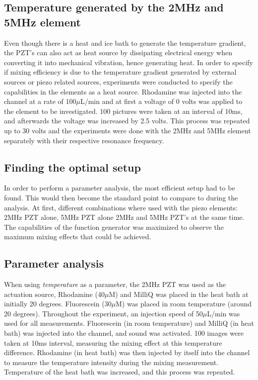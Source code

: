 \documentclass[twoside,twocolumn,9pt,a4paper]{IEEEtran}
\begin{document}
\subsection{Temperature generated by the 2MHz and 5MHz element}
\label{tempelements}

Even though there is a heat and ice bath to generate the temperature gradient, the PZT's can also act as heat source by dissipating electrical energy when converting it into mechanical vibration, hence generating heat. In order to specify if mixing efficiency is due to the temperature gradient generated by external sources or piezo related sources, experiments were conducted to specify the capabilities in the elements as a heat source. Rhodamine was injected into the channel at a rate of 100$\mu$L/min and at first a voltage of 0 volts was applied to the element to be investigated. 100 pictures were taken at an interval of 10ms, and afterwards the voltage was increased by 2.5 volts. This process was repeated up to 30 volts and the experiments were done with the 2MHz and 5MHz element separately with their respective resonance frequency.

\subsection{Finding the optimal setup}

In order to perform a parameter analysis, the most efficient setup had to be found. This would then become the standard point to compare to during the analysis. At first, different combinations where used with the piezo elements: 2MHz PZT alone, 5MHz PZT alone 2MHz and 5MHz PZT’s at the same time. The capabilities of the function generator was maximized to observe the maximum mixing effects that could be achieved.

\subsection{Parameter analysis}

When using \textit{temperature} as a parameter, the 2MHz PZT was used as the actuation source, Rhodamine (40$\mu$M) and MilliQ was placed in the heat bath at initially 20 degrees. Fluorescein (30$\mu$M) was placed in room temperature (around 20 degrees). Throughout the experiment, an injection speed of 50$\mu$L/min was used for all measurements. Fluorescein (in room temperature) and MilliQ (in heat bath) was injected into the channel, and sound was activated. 100 images were taken at 10ms interval, measuring the mixing effect at this temperature difference. Rhodamine (in heat bath) was then injected by itself into the channel to measure the temperature intensity during the mixing measurement. Temperature of the heat bath was increased, and this process was repeated.
\end{document}
